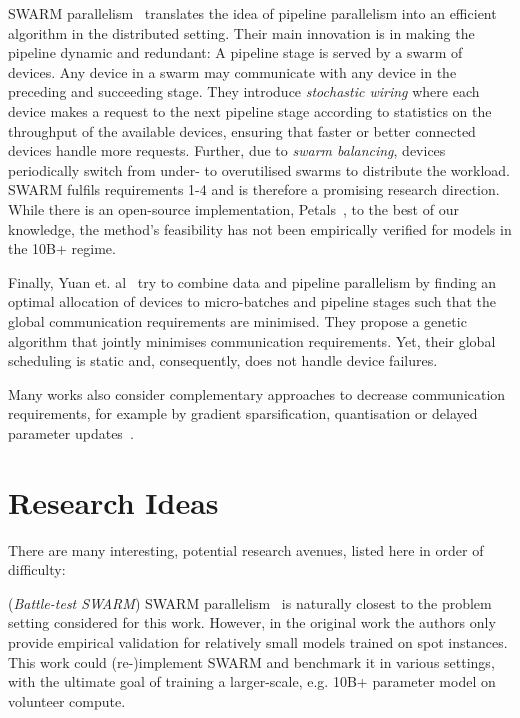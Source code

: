 \documentclass[conference, 10pt]{IEEEtran}
\begin{document}
SWARM parallelism~\cite{ryabinin2023} translates the idea of pipeline
parallelism into an efficient algorithm in the distributed setting. Their main
innovation is in making the pipeline dynamic and redundant: A pipeline stage is
served by a swarm of devices. Any device in a swarm may communicate with any
device in the preceding and succeeding stage. They introduce \textit{stochastic
wiring} where each device makes a request to the next pipeline stage according
to statistics on the throughput of the available devices, ensuring that faster
or better connected devices handle more requests. Further, due to \textit{swarm
balancing}, devices periodically switch from under- to overutilised swarms to
distribute the workload. SWARM fulfils requirements 1-4 and is therefore a
promising research direction. While there is an open-source implementation,
Petals~\cite{borzunov2023}, to the best of our knowledge, the method's
feasibility has not been empirically verified for models in the 10B+ regime.

Finally, Yuan et. al~\cite{yuan2022} try to combine data and pipeline
parallelism by finding an optimal allocation of devices to micro-batches and
pipeline stages such that the global communication requirements are minimised.
They propose a genetic algorithm that jointly minimises communication
requirements. Yet, their global scheduling is static and, consequently, does not
handle device failures.

Many works also consider complementary approaches to decrease communication
requirements, for example by gradient sparsification, quantisation or delayed
parameter updates~\cite{yuan2022, ryabinin2023, tang2020}.

\section{Research Ideas}

There are many interesting, potential research avenues, listed here in order of
difficulty:

(\textit{Battle-test SWARM}) SWARM parallelism~\cite{ryabinin2023} is naturally
closest to the problem setting considered for this work. However, in the
original work the authors only provide empirical validation for relatively small
models trained on spot instances. This work could (re-)implement SWARM and
benchmark it in various settings, with the ultimate goal of training a
larger-scale, e.g. 10B+ parameter model on volunteer compute.
\end{document}
